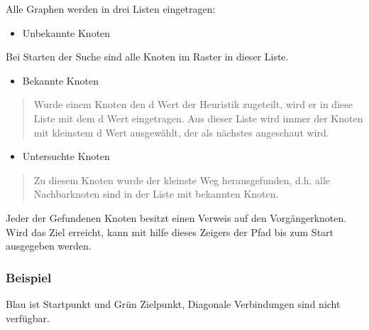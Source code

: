 Alle Graphen werden in drei Listen eingetragen:

\begin{itemize}
\item Unbekannte Knoten
\end{itemize}

Bei Starten der Suche sind alle Knoten im Raster in dieser Liste.

\begin{itemize}
\item Bekannte Knoten
\end{itemize}

\begin{quote}
Wurde einem Knoten den d Wert der Heuristik zugeteilt, wird er in diese
Liste mit dem d Wert eingetragen. Aus dieser Liste wird immer der Knoten
mit kleinstem d Wert ausgewählt, der als nächstes angeschaut wird.
\end{quote}

\begin{itemize}
\item Untersuchte Knoten
\end{itemize}

\begin{quote}
Zu diesem Knoten wurde der kleinste Weg herausgefunden, d.h. alle
Nachbarknoten sind in der Liste mit bekannten Knoten.
\end{quote}

Jeder der Gefundenen Knoten besitzt einen Verweis auf den
Vorgängerknoten. Wird das Ziel erreicht, kann mit hilfe dieses Zeigers
der Pfad bis zum Start ausgegeben werden.
\cite[Schmidt, Fuchs]{asterngeo}

\subsubsection{Beispiel}

Blau ist Startpunkt und Grün Zielpunkt, Diagonale Verbindungen sind
nicht verfügbar.



